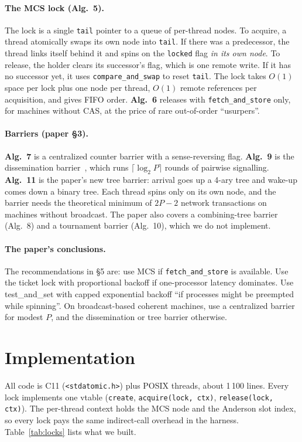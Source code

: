 \documentclass[10pt,twocolumn]{article}
\begin{document}
\paragraph{The MCS lock (Alg.~5).} The lock is a single \texttt{tail} pointer to a queue of per-thread
nodes. To acquire, a thread atomically swaps its own node into \texttt{tail}. If there was a
predecessor, the thread links itself behind it and spins on the \texttt{locked} flag \emph{in its own
node}. To release, the holder clears its successor's flag, which is one remote write. If it has no
successor yet, it uses \texttt{compare\_and\_swap} to reset \texttt{tail}. The lock takes $O(1)$ space
per lock plus one node per thread, $O(1)$ remote references per acquisition, and gives FIFO order.
\textbf{Alg.~6} releases with \texttt{fetch\_and\_store} only, for machines without CAS, at the price
of rare out-of-order ``usurpers''.

\paragraph{Barriers (paper \S3).} \textbf{Alg.~7} is a centralized counter barrier with a
sense-reversing flag. \textbf{Alg.~9} is the dissemination barrier~\cite{hfm88}, which runs
$\lceil\log_2 P\rceil$ rounds of pairwise signalling. \textbf{Alg.~11} is the paper's new tree barrier:
arrival goes up a 4-ary tree and wake-up comes down a binary tree. Each thread spins only on its own
node, and the barrier needs the theoretical minimum of $2P-2$ network transactions on machines without
broadcast. The paper also covers a combining-tree barrier (Alg.~8) and a tournament barrier (Alg.~10),
which we do not implement.

\paragraph{The paper's conclusions.} The recommendations in \S5 are: use MCS if
\texttt{fetch\_and\_store} is available. Use the ticket lock with proportional backoff if
one-processor latency dominates. Use test\_and\_set with capped exponential backoff ``if processes
might be preempted while spinning''. On broadcast-based coherent machines, use a centralized
barrier for modest $P$, and the dissemination or tree barrier otherwise.

\section{Implementation}
\label{sec:impl}
All code is C11 (\texttt{<stdatomic.h>}) plus POSIX threads, about 1\,100 lines. Every lock implements one
vtable (\texttt{create}, \texttt{acquire(lock, ctx)}, \texttt{release(lock, ctx)}). The per-thread context
holds the MCS node and the Anderson slot index, so every lock pays the same indirect-call overhead in the
harness. Table~\ref{tab:locks} lists what we built.
\end{document}
